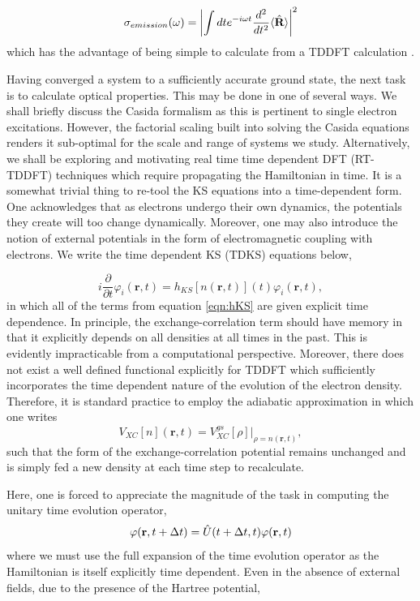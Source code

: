 \begin{equation}
    \sigma_{emission}(\omega) = \left| \int dt e^{-i\omega t}\frac{d^{2}}{dt^{2}} \langle \Hat{\textbf{R}} \rangle \right|^{2}
    \label{eqn:HHG}
\end{equation}
which has the advantage of being simple to calculate from a TDDFT calculation \cite{Oct_2015}.

Having converged a system to a sufficiently accurate ground state, the next task is to calculate optical properties. This may be done in one of several ways. We shall briefly discuss the Casida formalism as this is pertinent to single electron excitations. However, the factorial scaling built into solving the Casida equations renders it sub-optimal for the scale and range of systems we study. Alternatively, we shall be exploring and motivating real time time dependent DFT (RT-TDDFT) techniques which require propagating the Hamiltonian in time. It is a somewhat trivial thing to re-tool the KS equations into a time-dependent form. One acknowledges that as electrons undergo their own dynamics, the potentials they create will too change dynamically. Moreover, one may also introduce the notion of external potentials in the form of electromagnetic coupling with electrons. We write the time dependent KS (TDKS) equations below,

\begin{equation}
    i \frac{\partial}{\partial t} \varphi_{i}(\textbf{r},t) = h_{KS}[n(\textbf{r},t)](t)\varphi_{i}(\textbf{r},t),
    \label{eqn:TDKS}
\end{equation}
in which all of the terms from equation \ref{eqn:hKS} are given explicit time dependence. In principle, the exchange-correlation term should have memory in that it explicitly depends on all densities at all times in the past. This is evidently impracticable from a computational perspective. Moreover, there does not exist a well defined functional explicitly for TDDFT which sufficiently incorporates the time dependent nature of the evolution of the electron density. Therefore, it is standard practice to employ the adiabatic approximation in which one writes
\begin{equation}
    V_{XC}[n](\textbf{r},t) = V_{XC}^{gs}[\rho]|_{\rho = n(\textbf{r},t)},
    \label{eqn:adiabaticVxc}
\end{equation}
such that the form of the exchange-correlation potential remains unchanged and is simply fed a new density at each time step to recalculate.

Here, one is forced to appreciate the magnitude of the task in computing the unitary time evolution operator,
\begin{equation}
    \varphi(\textbf{r}, t+\Delta t) = \Hat{U}(t+\Delta t, t)\varphi(\textbf{r},t)
    \label{eqn:UTO}
\end{equation}
where we must use the full expansion of the time evolution operator as the Hamiltonian is itself explicitly time dependent. Even in the absence of external fields, due to the presence of the Hartree potential,

